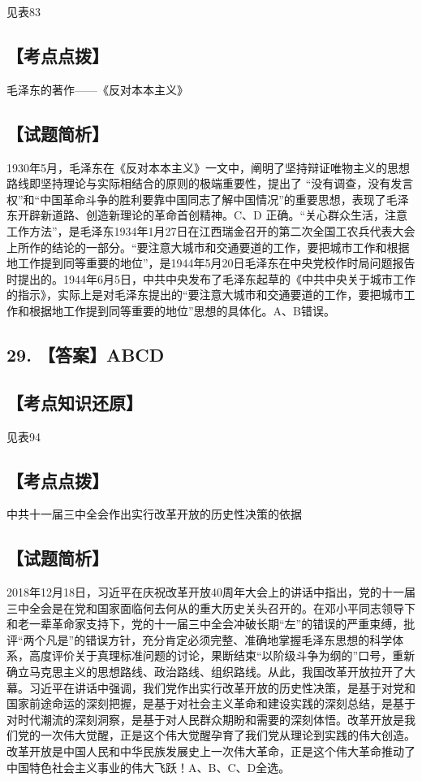 \documentclass[UTF8,11pt]{ctexart}
\begin{document}
见表83


\subsection*{【考点点拨】}

毛泽东的著作——《反对本本主义》


\subsection*{【试题简析】}

1930年5月，毛泽东在《反对本本主义》一文中，阐明了坚持辩证唯物主义的思想路线即坚持理论与实际相结合的原则的极端重要性，提出了 “没有调查，没有发言权”和“中国革命斗争的胜利要靠中国同志了解中国情况”的重要思想，表现了毛泽东开辟新道路、创造新理论的革命首创精神。C、D 正确。“关心群众生活，注意工作方法”，是毛泽东1934年1月27日在江西瑞金召开的第二次全国工农兵代表大会上所作的结论的一部分。“要注意大城市和交通要道的工作，要把城市工作和根据地工作提到同等重要的地位”，是1944年5月20日毛泽东在中央党校作时局问题报告时提出的。1944年6月5日，中共中央发布了毛泽东起草的《中共中央关于城市工作的指示》，实际上是对毛泽东提出的“要注意大城市和交通要道的工作，要把城市工作和根据地工作提到同等重要的地位”思想的具体化。A、B错误。


\subsection*{29. 【答案】ABCD}

\subsection*{【考点知识还原】}

见表94


\subsection*{【考点点拨】}

中共十一届三中全会作出实行改革开放的历史性决策的依据


\subsection*{【试题简析】}

2018年12月18日，习近平在庆祝改革开放40周年大会上的讲话中指出，党的十一届三中全会是在党和国家面临何去何从的重大历史关头召开的。在邓小平同志领导下和老一辈革命家支持下，党的十一届三中全会冲破长期“左”的错误的严重束缚，批评“两个凡是”的错误方针，充分肯定必须完整、准确地掌握毛泽东思想的科学体系，高度评价关于真理标准问题的讨论，果断结束“以阶级斗争为纲的”口号，重新确立马克思主义的思想路线、政治路线、组织路线。从此，我国改革开放拉开了大幕。习近平在讲话中强调，我们党作出实行改革开放的历史性决策，是基于对党和国家前途命运的深刻把握，是基于对社会主义革命和建设实践的深刻总结，是基于对时代潮流的深刻洞察，是基于对人民群众期盼和需要的深刻体悟。改革开放是我们党的一次伟大觉醒，正是这个伟大觉醒孕育了我们党从理论到实践的伟大创造。改革开放是中国人民和中华民族发展史上一次伟大革命，正是这个伟大革命推动了中国特色社会主义事业的伟大飞跃！A、B、C、D全选。
\end{document}
